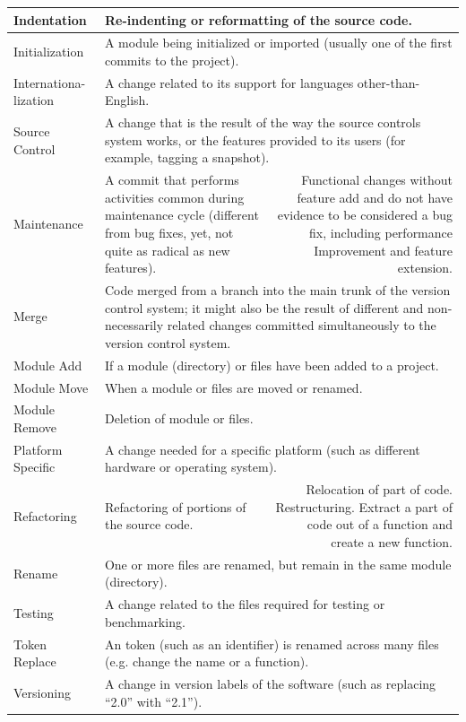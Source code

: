 \begin{table}[htbp]
\begin{tabular}{|p{6em}|p{9em}r|}
    \hline
    Indentation & \multicolumn{2}{p{21.5em}|}{Re-indenting or reformatting of the source code.} \\
    \hline
    Initialization & \multicolumn{2}{p{21.5em}|}{A module being initialized or imported (usually one of the first commits to the project).} \\
    \hline
    Internationa- lization & \multicolumn{2}{p{21.5em}|}{A change related to its support for languages other-than-English.} \\
    \hline
    Source Control & \multicolumn{2}{p{21.5em}|}{A change that is the result of the way the source controls system works, or the features provided to its users (for example, tagging a snapshot).} \\
    \hline
    Maintenance & \multicolumn{1}{p{9em}|}{A commit that performs activities common during maintenance cycle (different from bug fixes, yet, not quite as radical as new features).} & \multicolumn{1}{p{12.5em}|}{Functional changes without feature add and do not have evidence to be considered a bug fix, including performance Improvement and feature extension.} \\
    \hline
    Merge & \multicolumn{2}{p{21.5em}|}{Code merged from a branch into the main trunk of the version control system; it might also be the result of different and non-necessarily related changes committed simultaneously to the version control system.} \\
    \hline
    Module Add & \multicolumn{2}{p{21.5em}|}{If a module (directory) or files have been added to a project.} \\
    \hline
    Module Move & \multicolumn{2}{p{21.5em}|}{When a module or files are moved or renamed.} \\
    \hline
    Module Remove & \multicolumn{2}{p{21.5em}|}{Deletion of module or files.} \\
    \hline
    {Platform Specific} & \multicolumn{2}{p{21.5em}|}{A change needed for a specific platform (such as different hardware or operating system).} \\
    \hline
    Refactoring & \multicolumn{1}{p{9em}|}{Refactoring of portions of the source code.} & \multicolumn{1}{p{12.5em}|}{Relocation of part of code. Restructuring.
    Extract a part of code out of a function and create a new function.} \\
    \hline
    Rename & \multicolumn{2}{p{21.5em}|}{One or more files are renamed, but remain in the same module (directory).} \\
    \hline
    Testing & \multicolumn{2}{p{21.5em}|}{A change related to the files required for testing or benchmarking.} \\
    \hline
    Token Replace & \multicolumn{2}{p{21.5em}|}{An token (such as an identifier) is renamed across many files (e.g. change the name or a function).} \\
    \hline
    Versioning & \multicolumn{2}{p{21.5em}|}{A change in version labels of the software (such as replacing ``2.0'' with ``2.1'').} \\
    \hline
    \end{tabular}%
  \label{tab:categorization}%
\end{table}%
